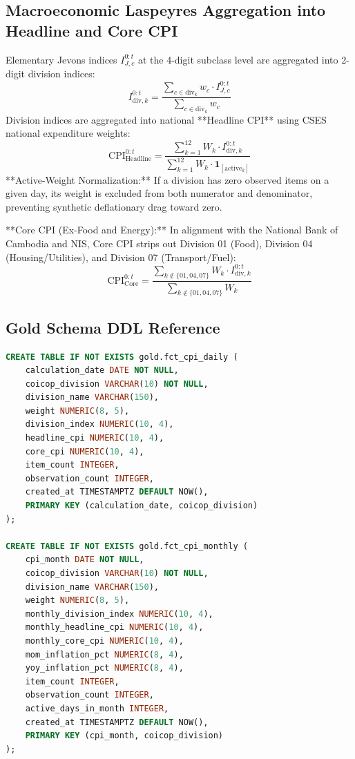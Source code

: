 \documentclass[11pt,a4paper]{article}
\begin{document}
\subsection{Macroeconomic Laspeyres Aggregation into Headline and Core CPI}
Elementary Jevons indices $I_{J, c}^{0:t}$ at the 4-digit subclass level are aggregated into 2-digit division indices:
\begin{equation}
I_{\text{div}, k}^{0:t} = \frac{\sum_{c \in \text{div}_k} w_c \cdot I_{J, c}^{0:t}}{\sum_{c \in \text{div}_k} w_c}
\end{equation}
Division indices are aggregated into national **Headline CPI** using CSES national expenditure weights:
\begin{equation}
\text{CPI}_{\text{Headline}}^{0:t} = \frac{\sum_{k=1}^{12} W_k \cdot I_{\text{div}, k}^{0:t}}{\sum_{k=1}^{12} W_k \cdot \mathbf{1}_{[\text{active}_k]}}
\end{equation}
**Active-Weight Normalization:** If a division has zero observed items on a given day, its weight is excluded from both numerator and denominator, preventing synthetic deflationary drag toward zero.

**Core CPI (Ex-Food and Energy):**
In alignment with the National Bank of Cambodia and NIS, Core CPI strips out Division 01 (Food), Division 04 (Housing/Utilities), and Division 07 (Transport/Fuel):
\begin{equation}
\text{CPI}_{\text{Core}}^{0:t} = \frac{\sum_{k \notin \{01, 04, 07\}} W_k \cdot I_{\text{div}, k}^{0:t}}{\sum_{k \notin \{01, 04, 07\}} W_k}
\end{equation}

\subsection{Gold Schema DDL Reference}
\begin{lstlisting}[language=SQL]
CREATE TABLE IF NOT EXISTS gold.fct_cpi_daily (
    calculation_date DATE NOT NULL,
    coicop_division VARCHAR(10) NOT NULL,
    division_name VARCHAR(150),
    weight NUMERIC(8, 5),
    division_index NUMERIC(10, 4),
    headline_cpi NUMERIC(10, 4),
    core_cpi NUMERIC(10, 4),
    item_count INTEGER,
    observation_count INTEGER,
    created_at TIMESTAMPTZ DEFAULT NOW(),
    PRIMARY KEY (calculation_date, coicop_division)
);

CREATE TABLE IF NOT EXISTS gold.fct_cpi_monthly (
    cpi_month DATE NOT NULL,
    coicop_division VARCHAR(10) NOT NULL,
    division_name VARCHAR(150),
    weight NUMERIC(8, 5),
    monthly_division_index NUMERIC(10, 4),
    monthly_headline_cpi NUMERIC(10, 4),
    monthly_core_cpi NUMERIC(10, 4),
    mom_inflation_pct NUMERIC(8, 4),
    yoy_inflation_pct NUMERIC(8, 4),
    item_count INTEGER,
    observation_count INTEGER,
    active_days_in_month INTEGER,
    created_at TIMESTAMPTZ DEFAULT NOW(),
    PRIMARY KEY (cpi_month, coicop_division)
);
\end{lstlisting}
\end{document}
